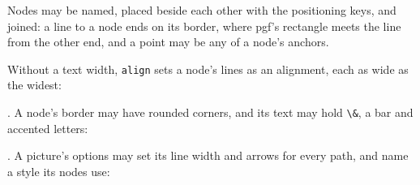 \documentclass{article}
\numberwithin{equation}{section}
\theoremstyle{definition}
\theoremstyle{remark}
\begin{document}
Nodes may be named, placed beside each other with the positioning keys, and joined: a line
to a node ends on its border, where pgf's rectangle meets the line from the other end, and
a point may be any of a node's anchors.
\begin{center}
\end{center}
Without a text width, \texttt{align} sets a node's lines as an alignment, each as wide as
the widest:
.
A node's border may have rounded corners, and its text may hold \verb|\&|, a bar and
accented letters:
.
A picture's options may set its line width and arrows for every path, and name a style its
nodes use:
\end{document}

